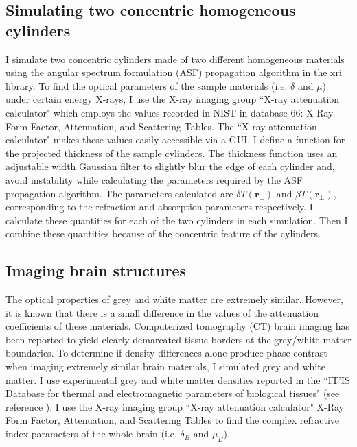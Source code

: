 \documentclass[10pt, a4paper, singlespacing]{report}
\begin{document}
\subsection{Simulating two concentric homogeneous cylinders}\label{2 cylinders}
I simulate two concentric cylinders made of two different homogeneous materials using the angular spectrum formulation (ASF) propagation algorithm in the xri library. 
To find the optical parameters of the sample materials (i.e. $\delta$ and $\mu$) under certain energy X-rays, I use the X-ray imaging group ``X-ray attenuation calculator" which employs the values recorded in NIST in database 66: X-Ray Form Factor, Attenuation, and Scattering Tables\cite{NIST}. The ``X-ray attenuation calculator" makes these values easily accessible via a GUI.
I define a function for the projected thickness of the sample cylinders. The thickness function uses an adjustable width Gaussian filter to slightly blur the edge of each cylinder and, avoid instability while calculating the parameters required by the ASF propagation algorithm. The parameters calculated are $\delta T(\mathbf{r}_{\perp})$ and $\beta T(\mathbf{r}_{\perp})$, corresponding to the refraction and absorption parameters respectively. I calculate these quantities for each of the two cylinders in each simulation. Then I combine these quantities because of the concentric feature of the cylinders.


\subsection{Imaging brain structures}\label{Brainz}
The optical properties of grey and white matter are extremely similar. However, it is known that there is a small difference in the values of the attenuation coefficients of these materials. Computerized tomography (CT) brain imaging has been reported to yield clearly demarcated tissue borders at the grey/white matter boundaries\cite{Beltran2}. To determine if density differences alone produce phase contrast when imaging extremely similar brain materials, I simulated grey and white matter. I use experimental grey and white matter densities reported in the ``IT’IS Database for thermal and electromagnetic parameters of biological tissues" (see reference \cite{ITIS}). I use the X-ray imaging group ``X-ray attenuation calculator" X-Ray Form Factor, Attenuation, and Scattering Tables\cite{NIST} to find the complex refractive index parameters of the whole brain (i.e. $\delta_B$ and $\mu_B$). 
\end{document}
